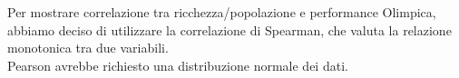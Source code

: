 


Per mostrare correlazione tra ricchezza/popolazione e performance Olimpica,
abbiamo deciso di utilizzare la correlazione di Spearman, che valuta la
relazione monotonica tra due variabili.\\
Pearson avrebbe richiesto una distribuzione normale dei dati.


